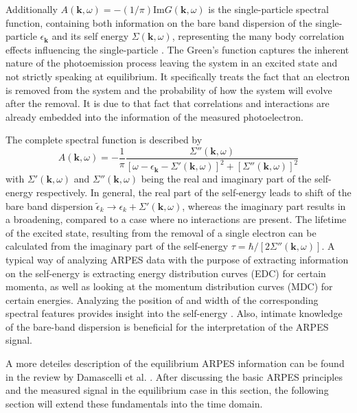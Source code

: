 Additionally $A(\mathbf{k}, \omega)=-(1/\pi)\text{Im}G(\mathbf{k}, \omega)$ is the single-particle spectral function, containing both information on the bare band dispersion of the single-particle $\epsilon_\mathbf{k}$ and its self energy $\Sigma(\mathbf{k}, \omega)$, representing the many body correlation effects influencing the single-particle \cite{mahan_many-particle_2000}.
The Green's function captures the inherent nature of the photoemission process leaving the system in an excited state and not strictly speaking at equilibrium.
It specifically treats the fact that an electron is removed from the system and the probability of how the system will evolve after the removal.
It is due to that fact that correlations and interactions are already embedded into the information of the measured photoelectron.

The complete spectral function is described by
\begin{equation}
	A(\mathbf{k}, \omega)= -\frac{1}{\pi} \frac{\Sigma''(\mathbf{k}, \omega)}{\left[ \omega - \epsilon_\mathbf{k} - \Sigma'(\mathbf{k}, \omega) \right]^2 + \left[ \Sigma''(\mathbf{k}, \omega) \right]^2}
\end{equation}
with $\Sigma'(\mathbf{k}, \omega)$ and $\Sigma''(\mathbf{k}, \omega)$ being the real and imaginary part of the self-energy respectively.
In general, the real part of the self-energy leads to shift of the bare band dispersion $\tilde{\epsilon}_k \rightarrow \epsilon_k + \Sigma'(\mathbf{k}, \omega)$, whereas the imaginary part results in a broadening, compared to a case where no interactions are present.
The lifetime of the excited state, resulting from the removal of a single electron can be calculated from the imaginary part of the self-energy $\tau=\hbar/\left[2\Sigma''(\mathbf{k}, \omega)\right]$.
A typical way of analyzing ARPES data with the purpose of extracting information on the self-energy is extracting energy distribution curves (EDC) for certain momenta, as well as looking at the momentum distribution curves (MDC) for certain energies.
Analyzing the position of and width of the corresponding spectral features provides insight into the self-energy \cite{norman_extraction_1999, freericks_what_2021,kurleto_about_2021}.
Also, intimate knowledge of the bare-band dispersion is beneficial for the interpretation of the ARPES signal.

A more deteiles description of the equilibrium ARPES information can be found in the review by Damascelli et al. \cite{damascelli_angle-resolved_2003}.
After discussing the basic ARPES principles and the measured signal in the equilibrium case in this section, the following section will extend these fundamentals into the time domain.

